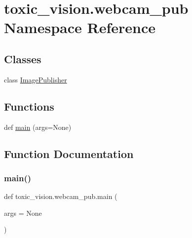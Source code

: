 \hypertarget{namespacetoxic__vision_1_1webcam__pub}{}\section{toxic\+\_\+vision.\+webcam\+\_\+pub Namespace Reference}
\label{namespacetoxic__vision_1_1webcam__pub}
\subsection*{Classes}
\begin{DoxyCompactItemize}
\item 
class \mbox{\hyperlink{classtoxic__vision_1_1webcam__pub_1_1ImagePublisher}{Image\+Publisher}}
\end{DoxyCompactItemize}
\subsection*{Functions}
\begin{DoxyCompactItemize}
\item 
def \mbox{\hyperlink{namespacetoxic__vision_1_1webcam__pub_a0d57aeae4d44f1dcb33eed5082cf3c87}{main}} (args=None)
\end{DoxyCompactItemize}


\subsection{Function Documentation}
\mbox{\label{namespacetoxic__vision_1_1webcam__pub_a0d57aeae4d44f1dcb33eed5082cf3c87}} 
\subsubsection{\texorpdfstring{main()}{main()}}
{\footnotesize\ttfamily def toxic\+\_\+vision.\+webcam\+\_\+pub.\+main (\begin{DoxyParamCaption}\item[{}]{args = {\ttfamily None} }\end{DoxyParamCaption})}


